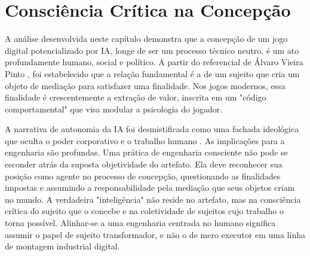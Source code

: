 \section{Consciência Crítica na Concepção}\label{sec:consciencia_critica_concepcao}

A análise desenvolvida neste capítulo demonstra que a concepção de um jogo digital potencializado por IA, longe de ser um processo 
técnico neutro, é um ato profundamente humano, social e político. A partir do referencial de Álvaro Vieira Pinto \cite{VieiraPinto2005}, foi estabelecido 
que a relação fundamental é a de um sujeito que cria um objeto de mediação para satisfazer uma finalidade. Nos jogos modernos, essa 
finalidade é crescentemente a extração de valor, inscrita em um "código comportamental" \cite{deJongPrey2022} que visa modular a psicologia do jogador.

A narrativa de autonomia da IA foi desmistificada como uma fachada ideológica que oculta o poder corporativo e o trabalho humano \cite{VieiraPinto2005}. As 
implicações para a engenharia são profundas. Uma prática de engenharia consciente não pode se esconder atrás da suposta objetividade 
do artefato. Ela deve reconhecer sua posição como agente no processo de concepção, questionando as finalidades impostas e assumindo 
a responsabilidade pela mediação que seus objetos criam no mundo. A verdadeira "inteligência" não reside no artefato, mas na 
consciência crítica do sujeito que o concebe e na coletividade de sujeitos cujo trabalho o torna possível. Alinhar-se a uma 
engenharia centrada no humano significa assumir o papel de sujeito transformador, e não o de mero executor em uma linha de montagem 
industrial digital.

